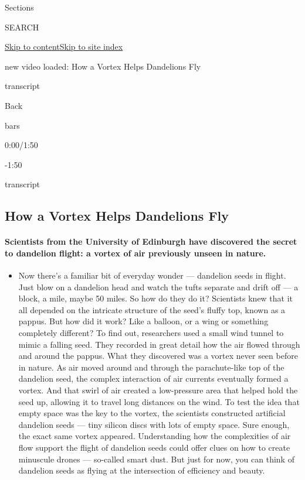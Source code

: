 Sections

SEARCH

\protect\hyperlink{site-content}{Skip to
content}\protect\hyperlink{site-index}{Skip to site index}

new video loaded: How a Vortex Helps Dandelions Fly

transcript

Back

bars

0:00/1:50

-1:50

transcript

\hypertarget{how-a-vortex-helps-dandelions-fly}{%
\subsection{How a Vortex Helps Dandelions
Fly}\label{how-a-vortex-helps-dandelions-fly}}

\hypertarget{scientists-from-the-university-of-edinburgh-have-discovered-the-secret-to-dandelion-flight-a-vortex-of-air-previously-unseen-in-nature}{%
\paragraph{Scientists from the University of Edinburgh have discovered
the secret to dandelion flight: a vortex of air previously unseen in
nature.}\label{scientists-from-the-university-of-edinburgh-have-discovered-the-secret-to-dandelion-flight-a-vortex-of-air-previously-unseen-in-nature}}

\begin{itemize}
\tightlist
\item
  Now there's a familiar bit of everyday wonder --- dandelion seeds in
  flight. Just blow on a dandelion head and watch the tufts separate and
  drift off --- a block, a mile, maybe 50 miles. So how do they do it?
  Scientists knew that it all depended on the intricate structure of the
  seed's fluffy top, known as a pappus. But how did it work? Like a
  balloon, or a wing or something completely different? To find out,
  researchers used a small wind tunnel to mimic a falling seed. They
  recorded in great detail how the air flowed through and around the
  pappus. What they discovered was a vortex never seen before in nature.
  As air moved around and through the parachute-like top of the
  dandelion seed, the complex interaction of air currents eventually
  formed a vortex. And that swirl of air created a low-pressure area
  that helped hold the seed up, allowing it to travel long distances on
  the wind. To test the idea that empty space was the key to the vortex,
  the scientists constructed artificial dandelion seeds --- tiny silicon
  discs with lots of empty space. Sure enough, the exact same vortex
  appeared. Understanding how the complexities of air flow support the
  flight of dandelion seeds could offer clues on how to create minuscule
  drones --- so-called smart dust. But just for now, you can think of
  dandelion seeds as flying at the intersection of efficiency and
  beauty.
\end{itemize}

